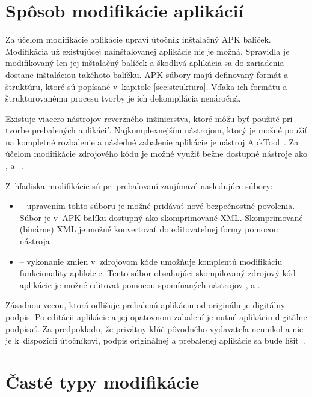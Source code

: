 \section{Spôsob modifikácie aplikácií}
Za účelom modifikácie aplikácie upraví útočník inštalačný APK balíček. Modifikácia už existujúcej nainštalovanej aplikácie nie je možná. Spravidla je modifikovaný len jej inštalačný balíček a škodlivá aplikácia sa do zariadenia dostane inštaláciou takéhoto balíčku.
APK súbory majú definovaný formát a štruktúru, ktoré sú popísané v~kapitole \ref{sec:struktura}. Vďaka ich formátu a štrukturovanému procesu tvorby je ich dekompilácia nenáročná.

Existuje viacero nástrojov reverzného inžinierstva, ktoré môžu byť použité pri tvorbe prebalených aplikácií. Najkomplexnejším nástrojom, ktorý je možné použiť na kompletné rozbalenie a následné zabalenie aplikácie je nástroj ApkTool~\cite{Apktool}. Za účelom modifikácie zdrojového kódu je možné využiť bežne dostupné nástroje ako ,  a  ~\cite{Dex2jar, jdgui, smali}.

Z~hľadiska modifikácie sú pri prebaľovaní zaujímavé nasledujúce súbory:

\begin{itemize}
	\item {} -- upravením tohto súboru je možné pridávať nové bezpečnostné povolenia. Súbor je v~APK balíku dostupný ako skomprimované XML. Skomprimované (binárne) XML je možné konvertovať do editovatelnej formy pomocou nástroja ~\cite{Apktool}.
	\item {} -- vykonanie zmien v~zdrojovom kóde umožňuje komplentú modifikáciu funkcionality aplikácie. Tento súbor obsahujúci skompilovaný zdrojový kód aplikácie je možné editovať pomocou spomínaných nástrojov ,  a .
\end{itemize}

Zásadnou vecou, ktorá odlišuje prebalenú aplikáciu od originálu je digitálny podpis. Po editácii aplikácie a jej opätovnom zabalení je nutné aplikáciu digitálne podpísať. Za predpokladu, že privátny kľúč pôvodného vydavateľa neunikol a nie je k~dispozícii útočníkovi, podpis originálnej a prebalenej aplikácie sa bude líšiť~\cite{Nolan2012a}. 

\section{Časté typy modifikácie}

